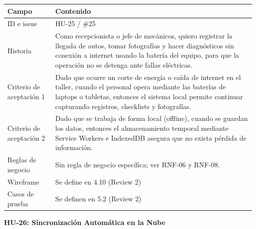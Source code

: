 {\def\LTcaptype{none} %
\begin{longtable}[]{@{}
  >{\raggedright\arraybackslash}p{}
  >{\raggedright\arraybackslash}p{}@{}}
\toprule\noalign{}
\begin{minipage}[b]{\linewidth}\raggedright
\textbf{Campo}
\end{minipage} & \begin{minipage}[b]{\linewidth}\raggedright
\textbf{Contenido}
\end{minipage} \\
\midrule\noalign{}
\endhead
\bottomrule\noalign{}
\endlastfoot
ID e issue & HU-25 / \#25 \\
Historia & Como recepcionista o jefe de mecánicos, quiero registrar la
llegada de autos, tomar fotografías y hacer diagnósticos sin conexión a
internet usando la batería del equipo, para que la operación no se
detenga ante fallas eléctricas. \\
Criterio de aceptación 1 & Dado que ocurre un corte de energía o caída
de internet en el taller, cuando el personal opera mediante las baterías
de laptops o tabletas, entonces el sistema local permite continuar
capturando registros, checklists y fotografías. \\
Criterio de aceptación 2 & Dado que se trabaja de forma local (offline),
cuando se guardan los datos, entonces el almacenamiento temporal
mediante Service Workers e IndexedDB asegura que no exista pérdida de
información. \\
Reglas de negocio & Sin regla de negocio específica; ver RNF-06 y
RNF-08. \\
Wireframe & Se define en 4.10 (Review 2) \\
Casos de prueba & Se definen en 5.2 (Review 2) \\
\end{longtable}
}

\textbf{HU-26: Sincronización Automática en la Nube}

